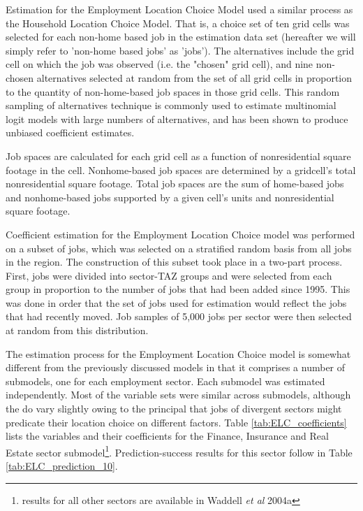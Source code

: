 Estimation for the Employment Location Choice Model used a similar
process as the Household Location Choice Model. That is, a choice
set of ten grid cells was selected for each non-home based job in
the estimation data set (hereafter we will simply refer to
'non-home based jobs' as 'jobs'). The alternatives include the
grid cell on which the job was observed (i.e. the "chosen" grid
cell), and nine non-chosen alternatives selected at random from
the set of all grid cells in proportion to the quantity of
non-home-based job spaces in those grid cells.  This random
sampling of alternatives technique is commonly used to estimate
multinomial logit models with large numbers of alternatives, and
has been shown to produce unbiased coefficient estimates.

Job spaces are calculated for each grid cell as a function of
nonresidential square footage in the cell. Nonhome-based job
spaces are determined by a gridcell's total nonresidential square
footage.  Total job spaces are the sum of home-based jobs and
nonhome-based jobs supported by a given cell's units and
nonresidential square footage.

Coefficient estimation for the Employment Location Choice model
was performed on a subset of jobs, which was selected on a
stratified random basis from all jobs in the region.  The
construction of this subset took place in a two-part process.
First, jobs were divided into sector-TAZ groups and were selected
from each group in proportion to the number of jobs that had been
added since 1995.  This was done in order that the set of jobs
used for estimation would reflect the jobs that had recently
moved.  Job samples of 5,000 jobs per sector were then selected at
random from this distribution.

The estimation process for the Employment Location Choice model is
somewhat different from the previously discussed models in that it
comprises a number of submodels, one for each employment sector.
Each submodel was estimated independently.  Most of the variable
sets were similar across submodels, although the do vary slightly
owing to the principal that jobs of divergent sectors might
predicate their location choice on different factors.  Table
\ref{tab:ELC_coefficients} lists the variables and their
coefficients for the Finance, Insurance and Real Estate sector
submodel\footnote{results for all other sectors are available in
Waddell \emph{et al} 2004a}.  Prediction-success results for this
sector follow in Table \ref{tab:ELC_prediction_10}.

